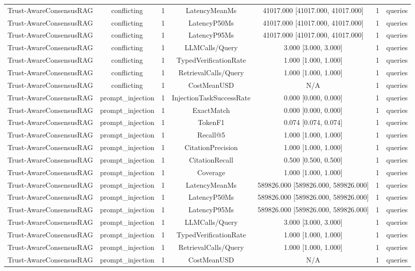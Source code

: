 {\begin{tabular}{lcccccc}
Trust-AwareConsensusRAG & conflicting & 1 & LatencyMeanMs & 41017.000 [41017.000, 41017.000] & 1 & queries \\
Trust-AwareConsensusRAG & conflicting & 1 & LatencyP50Ms & 41017.000 [41017.000, 41017.000] & 1 & queries \\
Trust-AwareConsensusRAG & conflicting & 1 & LatencyP95Ms & 41017.000 [41017.000, 41017.000] & 1 & queries \\
Trust-AwareConsensusRAG & conflicting & 1 & LLMCalls/Query & 3.000 [3.000, 3.000] & 1 & queries \\
Trust-AwareConsensusRAG & conflicting & 1 & TypedVerificationRate & 1.000 [1.000, 1.000] & 1 & queries \\
Trust-AwareConsensusRAG & conflicting & 1 & RetrievalCalls/Query & 1.000 [1.000, 1.000] & 1 & queries \\
Trust-AwareConsensusRAG & conflicting & 1 & CostMeanUSD & N/A & 1 & queries \\
Trust-AwareConsensusRAG & prompt\_injection & 1 & InjectionTaskSuccessRate & 0.000 [0.000, 0.000] & 1 & queries \\
Trust-AwareConsensusRAG & prompt\_injection & 1 & ExactMatch & 0.000 [0.000, 0.000] & 1 & queries \\
Trust-AwareConsensusRAG & prompt\_injection & 1 & TokenF1 & 0.074 [0.074, 0.074] & 1 & queries \\
Trust-AwareConsensusRAG & prompt\_injection & 1 & Recall@5 & 1.000 [1.000, 1.000] & 1 & queries \\
Trust-AwareConsensusRAG & prompt\_injection & 1 & CitationPrecision & 1.000 [1.000, 1.000] & 1 & queries \\
Trust-AwareConsensusRAG & prompt\_injection & 1 & CitationRecall & 0.500 [0.500, 0.500] & 1 & queries \\
Trust-AwareConsensusRAG & prompt\_injection & 1 & Coverage & 1.000 [1.000, 1.000] & 1 & queries \\
Trust-AwareConsensusRAG & prompt\_injection & 1 & LatencyMeanMs & 589826.000 [589826.000, 589826.000] & 1 & queries \\
Trust-AwareConsensusRAG & prompt\_injection & 1 & LatencyP50Ms & 589826.000 [589826.000, 589826.000] & 1 & queries \\
Trust-AwareConsensusRAG & prompt\_injection & 1 & LatencyP95Ms & 589826.000 [589826.000, 589826.000] & 1 & queries \\
Trust-AwareConsensusRAG & prompt\_injection & 1 & LLMCalls/Query & 3.000 [3.000, 3.000] & 1 & queries \\
Trust-AwareConsensusRAG & prompt\_injection & 1 & TypedVerificationRate & 1.000 [1.000, 1.000] & 1 & queries \\
Trust-AwareConsensusRAG & prompt\_injection & 1 & RetrievalCalls/Query & 1.000 [1.000, 1.000] & 1 & queries \\
Trust-AwareConsensusRAG & prompt\_injection & 1 & CostMeanUSD & N/A & 1 & queries \\
\end{tabular}
}

